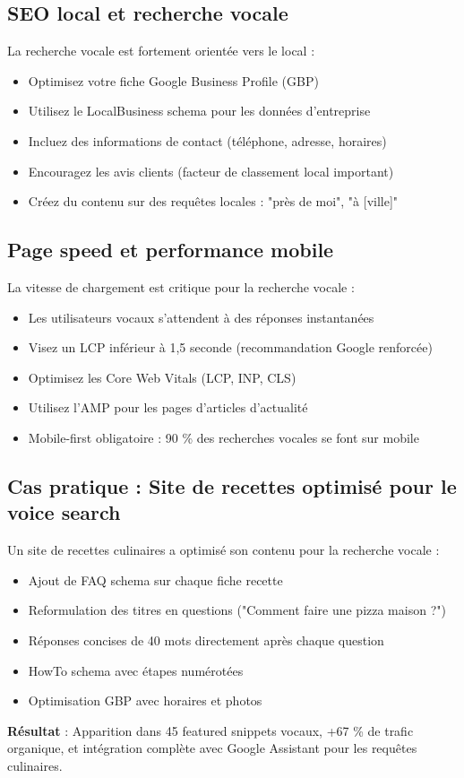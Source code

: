 \documentclass[12pt,a4paper,twoside]{report}
\begin{document}
\subsection{SEO local et recherche vocale}

La recherche vocale est fortement orientée vers le local :

\begin{itemize}
    \item Optimisez votre fiche Google Business Profile (GBP)
    \item Utilisez le LocalBusiness schema pour les données d'entreprise
    \item Incluez des informations de contact (téléphone, adresse, horaires)
    \item Encouragez les avis clients (facteur de classement local important)
    \item Créez du contenu sur des requêtes locales : "près de moi", "à [ville]"
\end{itemize}

\subsection{Page speed et performance mobile}

La vitesse de chargement est critique pour la recherche vocale :

\begin{itemize}
    \item Les utilisateurs vocaux s'attendent à des réponses instantanées
    \item Visez un LCP inférieur à 1,5 seconde (recommandation Google renforcée)
    \item Optimisez les Core Web Vitals (LCP, INP, CLS)
    \item Utilisez l'AMP pour les pages d'articles d'actualité
    \item Mobile-first obligatoire : 90 \% des recherches vocales se font sur mobile
\end{itemize}

\subsection{Cas pratique : Site de recettes optimisé pour le voice search}

Un site de recettes culinaires a optimisé son contenu pour la recherche vocale :

\begin{itemize}
    \item Ajout de FAQ schema sur chaque fiche recette
    \item Reformulation des titres en questions ("Comment faire une pizza maison ?")
    \item Réponses concises de 40 mots directement après chaque question
    \item HowTo schema avec étapes numérotées
    \item Optimisation GBP avec horaires et photos
\end{itemize}
\textbf{Résultat} : Apparition dans 45 featured snippets vocaux, +67 \% de trafic organique, et intégration complète avec Google Assistant pour les requêtes culinaires.
\end{document}
